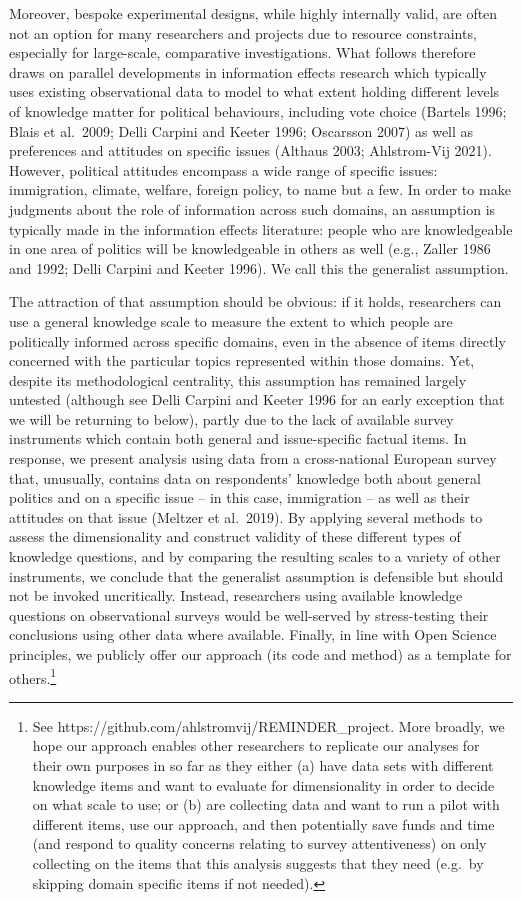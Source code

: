\documentclass[11pt,halfline,a4paper,]{ouparticle}
\begin{document}
Moreover, bespoke experimental designs, while highly internally valid,
are often not an option for many researchers and projects due to
resource constraints, especially for large-scale, comparative
investigations. What follows therefore draws on parallel developments in
information effects research which typically uses existing observational
data to model to what extent holding different levels of knowledge
matter for political behaviours, including vote choice (Bartels 1996;
Blais et al.~2009; Delli Carpini and Keeter 1996; Oscarsson 2007) as
well as preferences and attitudes on specific issues (Althaus 2003;
Ahlstrom-Vij 2021). However, political attitudes encompass a wide range
of specific issues: immigration, climate, welfare, foreign policy, to
name but a few. In order to make judgments about the role of information
across such domains, an assumption is typically made in the information
effects literature: people who are knowledgeable in one area of politics
will be knowledgeable in others as well (e.g., Zaller 1986 and 1992;
Delli Carpini and Keeter 1996). We call this the generalist assumption.

The attraction of that assumption should be obvious: if it holds,
researchers can use a general knowledge scale to measure the extent to
which people are politically informed across specific domains, even in
the absence of items directly concerned with the particular topics
represented within those domains. Yet, despite its methodological
centrality, this assumption has remained largely untested (although see
Delli Carpini and Keeter 1996 for an early exception that we will be
returning to below), partly due to the lack of available survey
instruments which contain both general and issue-specific factual items.
In response, we present analysis using data from a cross-national
European survey that, unusually, contains data on respondents' knowledge
both about general politics and on a specific issue -- in this case,
immigration -- as well as their attitudes on that issue (Meltzer et
al.~2019). By applying several methods to assess the dimensionality and
construct validity of these different types of knowledge questions, and
by comparing the resulting scales to a variety of other instruments, we
conclude that the generalist assumption is defensible but should not be
invoked uncritically. Instead, researchers using available knowledge
questions on observational surveys would be well-served by
stress-testing their conclusions using other data where available.
Finally, in line with Open Science principles, we publicly offer our
approach (its code and method) as a template for others.\footnote{See
  https://github.com/ahlstromvij/REMINDER\_project. More broadly, we
  hope our approach enables other researchers to replicate our analyses
  for their own purposes in so far as they either (a) have data sets
  with different knowledge items and want to evaluate for dimensionality
  in order to decide on what scale to use; or (b) are collecting data
  and want to run a pilot with different items, use our approach, and
  then potentially save funds and time (and respond to quality concerns
  relating to survey attentiveness) on only collecting on the items that
  this analysis suggests that they need (e.g.~by skipping domain
  specific items if not needed).}
\end{document}
